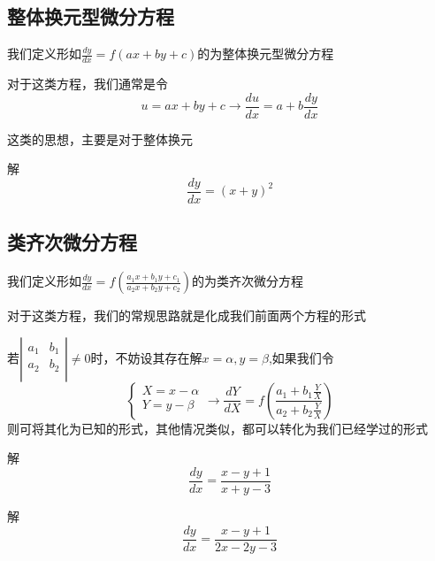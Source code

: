 \documentclass[lang=cn,14pt]{elegantbook}
\begin{document}
	\subsection{整体换元型微分方程}
		\begin{definition}[整体换元型微分方程]
			我们定义形如$\frac{dy}{dx}=f(ax+by+c)$的为整体换元型微分方程
		\end{definition}
	\begin{remark}
		对于这类方程，我们通常是令
		\begin{equation*}
			u=ax+by+c\rightarrow\frac{du}{dx}=a+b\frac{dy}{dx}
		\end{equation*}
	\end{remark}
	\begin{remark}
		这类的思想，主要是对于整体换元
	\end{remark}
	\begin{example}
		解
		\begin{equation*}
			\frac{dy}{dx}=(x+y)^{2}
		\end{equation*}
	\end{example}
	\subsection{类齐次微分方程}
		\begin{definition}[类齐次微分方程]
		我们定义形如$\frac{dy}{dx}=f(\frac{a_1x+b_1y+c_1}{a_2x+b_2y+c_2})$的为类齐次微分方程
	\end{definition}
	\begin{remark}
		对于这类方程，我们的常规思路就是化成我们前面两个方程的形式
	\end{remark}
	\begin{remark}
		若$\left| \begin{matrix}
			a_1&		b_1\\
			a_2&		b_2\\
		\end{matrix} \right|\ne 0$时，不妨设其存在解$x=\alpha,y=\beta$,如果我们令
		\begin{equation*}
			\begin{cases}
				X=x-\alpha\\
				Y=y-\beta\\
			\end{cases}\rightarrow \frac{dY}{dX}=f\left( \frac{a_1+b_1\frac{Y}{X}}{a_2+b_2\frac{Y}{X}} \right) 
		\end{equation*}
		则可将其化为已知的形式，其他情况类似，都可以转化为我们已经学过的形式
	\end{remark}
	\begin{example}
		解\begin{equation*}
			\frac{dy}{dx}=\frac{x-y+1}{x+y-3}
		\end{equation*}
	\end{example}
	\vspace{2cm}
	\begin{example}
		解\begin{equation*}
			\frac{dy}{dx}=\frac{x-y+1}{2x-2y-3}
		\end{equation*}
	\end{example}
	\vspace{2cm}
\end{document}
